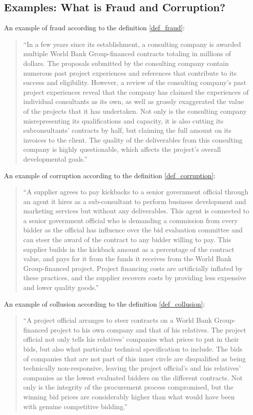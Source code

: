 \subsection{Examples: What is Fraud and Corruption?}

An example of fraud according to the definition \ref{def_fraud}: \begin{quote}
``In a few years since its establishment, a consulting company is awarded multiple World Bank Group-financed contracts totaling in millions of dollars.  The proposals submitted by the consulting company contain numerous past project experiences and references that contribute to its success and eligibility.  However, a review of the consulting company's past project experiences reveal that the company has claimed the experiences of individual consultants as its own, as well as grossly exaggerated the value of the projects that it has undertaken.  Not only is the consulting company misrepresenting its qualifications and capacity, it is also cutting its subconsultants' contracts by half, but claiming the full amount on its invoices to the client.  The quality of the deliverables from this consulting company is highly questionable, which affects the project's overall developmental goals.''\parencite{wb_examples}
\end{quote}

An example of corruption according to the definition \ref{def_corruption}: \begin{quote}
``A supplier agrees to pay kickbacks to a senior government official through an agent it hires as a sub-consultant to perform business development and marketing services but without any deliverables.  This agent is connected to a senior government official who is demanding a commission from every bidder as the official has influence over the bid evaluation committee and can steer the award of the contract to any bidder willing to pay.  This supplier builds in the kickback amount as a percentage of the contract value, and pays for it from the funds it receives from the World Bank Group-financed project. Project financing costs are artificially inflated by these practices, and the supplier recovers costs by providing less expensive and lower quality goods.''\parencite{wb_examples}
\end{quote}

An example of collusion according to the definition \ref{def_collusion}: \begin{quote}
``A project official arranges to steer contracts on a World Bank Group-financed project to his own company and that of his relatives.  The project official not only tells his relatives' companies what prices to put in their bids, but also what particular technical specification to include.  The bids of companies that are not part of this inner circle are disqualified as being technically non-responsive, leaving the project official's and his relatives' companies as the lowest evaluated bidders on the different contracts.  Not only is the integrity of the procurement process compromised, but the winning bid prices are considerably higher than what would have been with genuine competitive bidding.''\parencite{wb_examples}
\end{quote}

